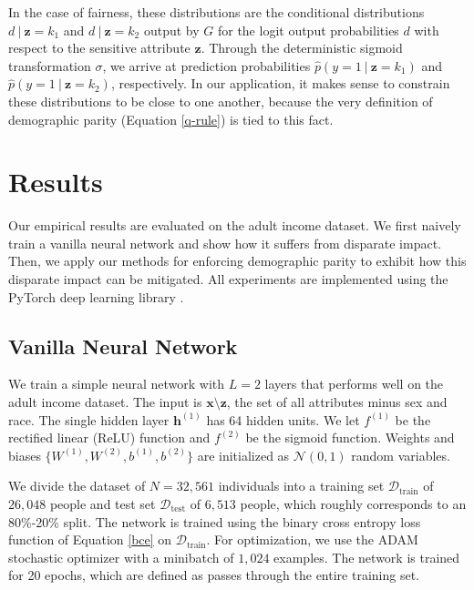 \documentclass{article}
\newcommand\given[1][]{\:#1\vert\:}
\newcommand{\bd}[1]{\boldsymbol{#1}}
\newcommand{\hp}{\hat{p}}
\newcommand{\idx}[3][]{{#2}^{(#3)}_{#1}}
\newcommand{\bidx}[3][]{\bd{#2}^{(#3)}_{#1}}
\begin{document}
In the case of fairness, these distributions are the conditional distributions $d \given \bd z = k_1$ and $d \given \bd z = k_2$ output by $G$ for the logit output probabilities $d$ with respect to the sensitive attribute $\bd z$.  Through the deterministic sigmoid transformation $\sigma$, we arrive at prediction probabilities $\hp(y = 1 \given \bd z = k_1)$ and $\hp(y = 1 \given \bd z = k_2)$, respectively.  In our application, it makes sense to constrain these distributions to be close to one another, because the very definition of demographic parity (Equation \ref{q-rule}) is tied to this fact.          

\section{Results}
Our empirical results are evaluated on the adult income dataset.  We first naively train a vanilla neural network and show how it suffers from disparate impact.  Then, we apply our methods for enforcing demographic parity to exhibit how this disparate impact can be mitigated.  All experiments are implemented using the PyTorch deep learning library \citep{paszke2017pytorch}.  

\subsection{Vanilla Neural Network} \label{vanilla-net}

We train a simple neural network with $L = 2$ layers that performs well on the adult income dataset.  The input is $\bd x \setminus \bd z$, the set of all attributes minus sex and race.  The single hidden layer $\bidx h 1$ has 64 hidden units.  We let $\idx f 1$ be the rectified linear (ReLU) function and $\idx f 2$ be the sigmoid function.  Weights and biases $\{\idx W 1, \idx W 2, \idx b 1, \idx b 2\}$ are initialized as $\mathcal{N}(0, 1)$ random variables.  

We divide the dataset of $N = 32,561$ individuals into a training set $\mathcal{D}_\text{train}$ of $26,048$ people and test set $\mathcal{D}_\text{test}$ of $6,513$ people, which roughly corresponds to an 80\%-20\% split.  The network is trained using the binary cross entropy loss function of Equation \ref{bce} on $\mathcal{D}_\text{train}$.  For optimization, we use the ADAM stochastic optimizer \citep{kingma2014adam} with a minibatch of $1,024$ examples.  The network is trained for 20 epochs, which are defined as passes through the entire training set.   
\end{document}
